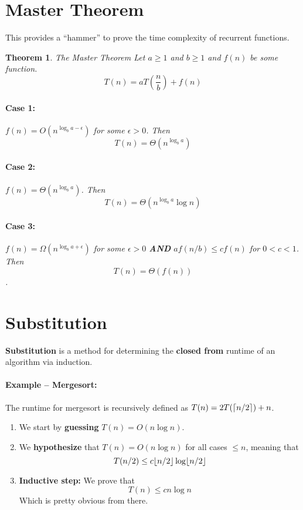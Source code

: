 \documentclass[a4paper,12pt]{report}
\newtheorem{theorem}{Theorem}
\DeclarePairedDelimiter{\ceil}{\lceil}{\rceil}
\DeclarePairedDelimiter{\floor}{\lfloor}{\rfloor}
\begin{document}
\section{Master Theorem}

This provides a ``hammer'' to prove the time complexity of recurrent functions.
\begin{theorem}{The Master Theorem}
Let $a \geq 1$ and $b \geq 1$ and $f(n)$ be some function.
\begin{equation}
T(n) = aT(\frac{n}{b}) + f(n)
\end{equation}

\paragraph{Case 1: } $f(n) = O(n^{\log_b a - \epsilon})$ for some $\epsilon > 0$. Then $$T(n) = \Theta(n^{\log_b a})$$

\paragraph{Case 2: } $f(n) = \Theta(n^{\log_b a})$. Then $$T(n) = \Theta(n^{\log_b a} \log n)$$

\paragraph{Case 3: } $f(n) = \Omega(n^{\log_b a + \epsilon})$ for some $\epsilon > 0$ \textbf{AND} $af(n/b) \leq c f(n)$ for $0 < c < 1$. Then $$T(n) = \Theta(f(n))$$.
\end{theorem}








\section{Substitution}

\textbf{Substitution} is a method for determining the \textbf{closed from} runtime of an algorithm via induction.

\paragraph{Example -- Mergesort: } The runtime for mergesort is recursively defined as $T(n) = 2T(\ceil{n/2}) + n$.
\begin{enumerate}
\item We start by \textbf{guessing} $T(n) = O(n\log n)$. 
\item We \textbf{hypothesize} that $T(n) = O(n\log n)$ for all cases $\leq n$, meaning that
$$T(n/2) \leq c \floor{n/2}\log \floor{n/2}$$
\item \textbf{Inductive step:} We prove that $$T(n) \leq cn\log n$$ Which is pretty obvious from there. 
\end{enumerate}
\end{document}

